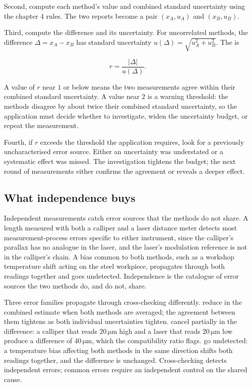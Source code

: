 Second, compute each method's value and combined standard
uncertainty using the chapter 4 rules. The two reports become a pair
$(x_{A}, u_{A})$ and $(x_{B}, u_{B})$.

Third, compute the difference and its uncertainty. For uncorrelated
methods, the difference $\Delta = x_{A} - x_{B}$ has standard
uncertainty $u(\Delta) = \sqrt{u_{A}^{2} + u_{B}^{2}}$. The
 is

\[
r = \frac{|\Delta|}{u(\Delta)}.
\]

A value of $r$ near $1$ or below means the two measurements agree
within their combined standard uncertainty. A value near $2$ is a
warning threshold: the methods disagree by about twice their
combined standard uncertainty, so the application must decide
whether to investigate, widen the uncertainty budget, or repeat the
measurement.

Fourth, if $r$ exceeds the threshold the application requires, look
for a previously uncharacterised error source. Either an
uncertainty was understated or a systematic effect was missed. The
investigation tightens the budget; the next round of measurements
either confirms the agreement or reveals a deeper effect.

\subsection{What independence buys}

Independent measurements catch error sources that the methods do not
share. A length measured with both a calliper and a laser distance
meter detects most measurement-process errors specific to either
instrument, since the calliper's parallax has no analogue in the
laser, and the laser's modulation reference is not in the calliper's
chain. A bias common to both methods, such as a workshop temperature
shift acting on the steel workpiece, propagates through both readings
together and goes undetected. Independence is the catalogue of error
sources the two methods do, and do not, share.

Three error families propagate through cross-checking differently.
 reduce in the combined estimate
when both methods are averaged; the agreement between them tightens
as both individual uncertainties tighten.  cancel partially in the difference: a calliper
that reads $20 \,\si{\micro\meter}$ high and a laser that reads $20
\,\si{\micro\meter}$ low produce a difference of $40 \,\si{\micro
\meter}$, which the compatibility ratio flags.  go undetected: a temperature bias affecting both
methods in the same direction shifts both readings together, and the
difference is unchanged. Cross-checking detects independent errors;
common errors require an independent control on the shared cause.

